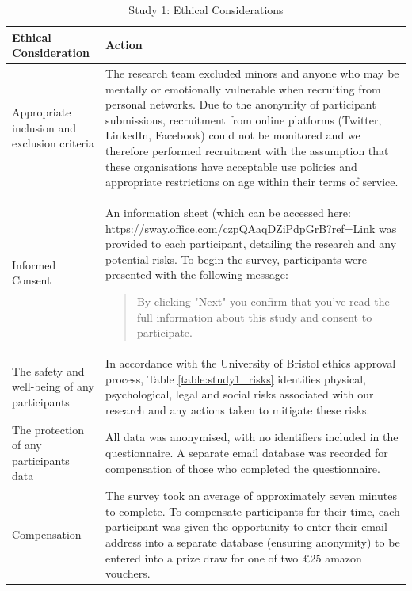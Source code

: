 \documentclass[manuscript,screen,review]{acmart}
\begin{document}
\begin{table}[h]
\begin{center}
\begin{tabular}{ | p{3cm} | p{11cm} |}
\hline
 Ethical Consideration & Action \\
 \hline
 \hline
 Appropriate inclusion and exclusion criteria & The research team excluded minors and anyone who may be mentally or emotionally vulnerable when recruiting from personal networks. Due to the anonymity of participant submissions, recruitment from online platforms (Twitter, LinkedIn, Facebook) could not be monitored and we therefore performed recruitment with the assumption that these organisations have acceptable use policies and appropriate restrictions on age within their terms of service.\\
 \hline
Informed Consent & An information sheet (which can be accessed here: \href{https://sway.office.com/czpQAaqDZiPdpGrB?ref=Link}{https://sway.office.com/czpQAaqDZiPdpGrB?ref=Link} was provided to each participant, detailing the research and any potential risks. To begin the survey, participants were presented with the following message:

\begin{quote}
    By clicking "Next" you confirm that you've read the full information about this study and consent to participate.
\end{quote} \\
 \hline
 The safety and well-being of any participants & In accordance with the University of Bristol ethics approval process, Table \ref{table:study1_risks} identifies physical, psychological, legal and social risks associated with our research and any actions taken to mitigate these risks. \\
\hline
The protection of any participants data & All data was anonymised, with no identifiers included in the questionnaire. A separate email database was recorded for compensation of those who completed the questionnaire. \\
\hline
Compensation & The survey took an average of approximately seven minutes to complete. To compensate participants for their time, each participant was given the opportunity to enter their email address into a separate database (ensuring anonymity) to be entered into a prize draw for one of two £25 amazon vouchers. \\
 \hline
\end{tabular}
\caption{Study 1: Ethical Considerations}
\label{table:study1_ethical_considerations}
\end{center}
\end{table}
\end{document}
